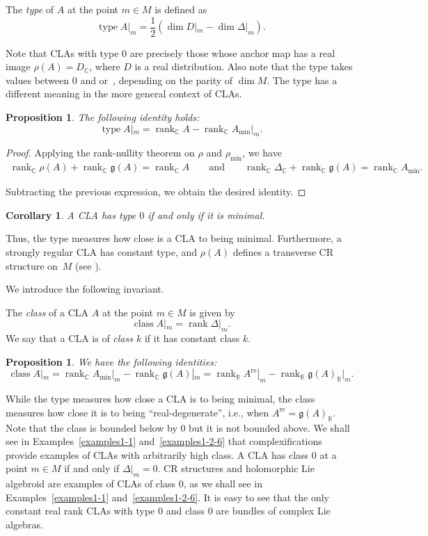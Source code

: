 \documentclass[pdftex]{sigma}
\numberwithin{equation}{section}
\newtheorem{Corollary}[Theorem]{Corollary}
\newtheorem{Proposition}[Theorem]{Proposition}
 { \theoremstyle{definition}
\newtheorem{Definition}[Theorem]{Definition}
\newtheorem{Note}[Theorem]{Note}
\newtheorem{Example}[Theorem]{Example}
\newtheorem{Examples}[Theorem]{Examples}
\newtheorem{Remark}[Theorem]{Remark} }
\newcommand{\R}{{\mathbb{R}}}
\newcommand{\C}{{\mathbb{C}}}
\newcommand{\g}{\mathfrak{g}}
\DeclareMathOperator{\type}{type}
\DeclareMathOperator{\rk}{rank}
\DeclareMathOperator{\real}{re}
\DeclareMathOperator{\class}{class}
\begin{document}
\begin{Definition}
  The {\em type} of $A$ at the point $m\in M$ is defined as
  \[\type A|_m= \frac{1}{2}(\dim D|_m-\dim \Delta|_m).\]
\end{Definition}
Note that CLAs with type $0$ are precisely those whose anchor map has a real image ${\rho(A)\!=\!D_{\C}}$, where $D$ is a real distribution. Also note that the type takes values between $0$ and  or~, depending on the parity of $\dim M$. The type has a different meaning in the more general context of CLAs.

\begin{Proposition}
  The following identity holds:
\[
  \type A|_m=\rk_{\C}A-\rk_{\C}A_{\min}|_m.
\]
\end{Proposition}
\begin{proof}
  Applying the rank-nullity theorem on $\rho$ and $\rho_{\min}$, we have
\begin{gather*}
\rk_{\C}\rho(A)+\rk_{\C}\g(A)=\rk_{\C}A\qquad \text{and} \qquad
\rk_{\C}\Delta_{\C}+\rk_{\C}\g(A)=\rk_{\C}A_{\min}.
\end{gather*}

Subtracting the previous expression, we obtain the desired identity.
\end{proof}

\begin{Corollary}\label{type0}
  A CLA has type $0$ if and only if it is minimal.
\end{Corollary}
Thus, the type measures how close is a CLA to being minimal. Furthermore, a strongly regular CLA has constant type, and $\rho(A)$ defines a transverse CR structure on~$M$ (see \cite[Definition~2.74]{aguero}).

We introduce the following invariant.
\begin{Definition}
  The {\em class} of a CLA $A$ at the point $m\in M$ is given by
  \[\class A|_m=\rk \Delta|_m.\]
   We say that a CLA is of {\em class $k$} if it has constant class $k$.
\end{Definition}
\begin{Proposition}We have the following identities:
   \[\class A|_m= \rk_{\C} A_{\min}|_m-\rk_{\C} \g(A)|_m=\rk_{\R} A^{\real}|_m-\rk_{\R} \g(A)_{\R}|_m.\]
\end{Proposition}
While the type measures how close a CLA is to being minimal, the class measures how close it is to being ``real-degenerate'', i.e., when $A^{\real}=\g(A)_{\R}$. Note that the class is bounded below by $0$ but it is not bounded above. We shall see in Examples~\ref{examples1-1} and~\ref{examples1-2-6} that complexifications provide examples of CLAs with arbitrarily high class.
A CLA has class $0$ at a point $m\in M$ if and only if $\Delta|_m=0$. CR structures and holomorphic Lie algebroid are examples of CLAs of class $0$, as we shall see in Examples~\ref{examples1-1} and~\ref{examples1-2-6}. It is easy to see that the only constant real rank CLAs with type $0$ and class $0$ are bundles of complex Lie algebras.
\end{document}
